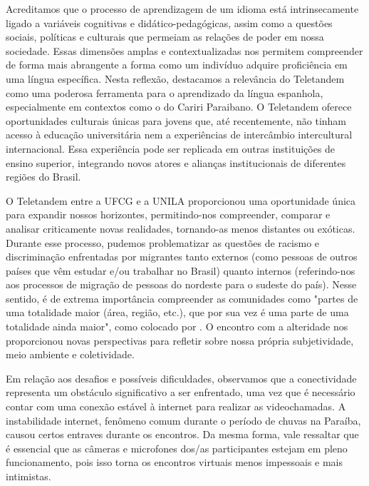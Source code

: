 \documentclass[portuguese]{textolivre}
\begin{document}
Acreditamos que o processo de aprendizagem de um idioma está intrinsecamente ligado a variáveis cognitivas e didático-pedagógicas, assim como a questões sociais, políticas e culturais que permeiam as relações de poder em nossa sociedade. Essas dimensões amplas e contextualizadas nos permitem compreender de forma mais abrangente a forma como um indivíduo adquire proficiência em uma língua específica. Nesta reflexão, destacamos a relevância do Teletandem como uma poderosa ferramenta para o aprendizado da língua espanhola, especialmente em contextos como o do Cariri Paraibano. O Teletandem oferece oportunidades culturais únicas para jovens que, até recentemente, não tinham acesso à educação universitária nem a experiências de intercâmbio intercultural internacional. Essa experiência pode ser replicada em outras instituições de ensino superior, integrando novos atores e alianças institucionais de diferentes regiões do Brasil.

O Teletandem entre a UFCG e a UNILA proporcionou uma oportunidade única para expandir nossos horizontes, permitindo-nos compreender, comparar e analisar criticamente novas realidades, tornando-as menos distantes ou exóticas. Durante esse processo, pudemos problematizar as questões de racismo e discriminação enfrentadas por migrantes tanto externos (como pessoas de outros países que vêm estudar e/ou trabalhar no Brasil) quanto internos (referindo-nos aos processos de migração de pessoas do nordeste para o sudeste do país). Nesse sentido, é de extrema importância compreender as comunidades como "partes de uma totalidade maior (área, região, etc.), que por sua vez é uma parte de uma totalidade ainda maior", como colocado por \textcite[p.166]{freire_pedagogia_1981}. O encontro com a alteridade nos proporcionou novas perspectivas para refletir sobre nossa própria subjetividade, meio ambiente e coletividade.

Em relação aos desafios e possíveis dificuldades, observamos que a conectividade representa um obstáculo significativo a ser enfrentado, uma vez que é necessário contar com uma conexão estável à internet para realizar as videochamadas. A instabilidade internet, fenômeno comum durante o período de chuvas na Paraíba, causou certos entraves durante os encontros. Da mesma forma, vale ressaltar que é essencial que as câmeras e microfones dos/as participantes estejam em pleno funcionamento, pois isso torna os encontros virtuais menos impessoais e mais intimistas. 
\end{document}
